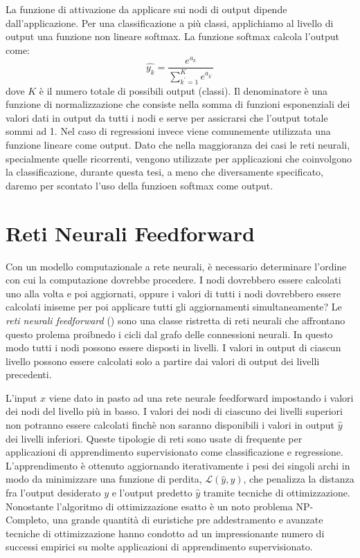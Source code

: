 La funzione di attivazione da applicare sui nodi di output dipende dall'applicazione.
Per una classificazione a pi\`u classi, applichiamo al livello di output una funzione non lineare softmax.
La funzione softmax calcola l'output come:
\begin{equation}
  \hat{y_k} = \frac{e^{a_k}}{\sum_{k^{'}=1}^{K} e^{a_{k^{'}}}}
\end{equation}
dove $K$ \`e il numero totale di possibili output (classi). Il denominatore \`e una funzione di normalizzazione che consiste nella somma di funzioni esponenziali dei valori dati in output da tutti i nodi e serve per assicrarsi che l'output totale sommi ad 1.
Nel caso di regressioni invece viene comunemente utilizzata una funzione lineare come output.
Dato che nella maggioranza dei casi le reti neurali, specialmente quelle ricorrenti, vengono utilizzate per applicazioni che coinvolgono la classificazione, durante questa tesi, a meno che diversamente specificato, daremo per scontato l'uso della funzioen softmax come output.

\section{Reti Neurali Feedforward}
Con un modello computazionale a rete neurali, \`e necessario determinare l'ordine con cui la computazione dovrebbe procedere.
I nodi dovrebbero essere calcolati uno alla volta e poi aggiornati, oppure i valori di tutti i nodi dovrebbero essere calcolati iniseme per poi applicare tutti gli aggiornamenti simultaneamente?
Le \emph{reti neurali feedforward} () sono una classe ristretta di reti neurali che affrontano questo prolema proibnedo i cicli dal grafo delle connessioni neurali. %
In questo modo tutti i nodi possono essere disposti in livelli.
I valori in output di ciascun livello possono essere calcolati solo a partire dai valori di output dei livelli precedenti.

L'input $x$ viene dato in pasto ad una rete neurale feedforward impostando i valori dei nodi del livello pi\`u in basso.
I valori dei nodi di ciascuno dei livelli superiori non potranno essere calcolati finch\`e non saranno disponibili i valori in output $\hat{y}$ dei livelli inferiori.
Queste tipologie di reti sono usate di frequente per applicazioni di apprendimento supervisionato come classificazione e regressione.
L'apprendimento \`e ottenuto aggiornando iterativamente i pesi dei singoli archi in modo da minimizzare una funzione di perdita, $\mathcal{L}(\hat{y},y)$, che penalizza la distanza fra l'output desiderato $y$ e l'output predetto $\hat{y}$ tramite tecniche di ottimizzazione.
Nonostante l'algoritmo di ottimizzazione esatto \`e un noto problema NP-Completo, una grande quantit\`a di euristiche pre addestramento e avanzate tecniche di ottimizzazione hanno condotto ad un impressionante numero di successi empirici su molte applicazioni di apprendimento supervisionato.

